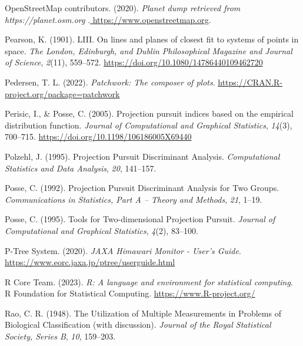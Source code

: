 \documentclass[
  letterpaper,
]{book}
\newlength{\cslhangindent}
\newlength{\cslentryspacingunit} %
\newenvironment{CSLReferences}[2] %
 {%
  \setlength{\parindent}{0pt}
  \ifodd #1
  \let\oldpar\par
  \def\par{\hangindent=\cslhangindent\oldpar}
  \fi
  \setlength{\parskip}{#2\cslentryspacingunit}
 }%
 {}
\begin{document}
\begin{CSLReferences}{1}{0}
\leavevmode{}%
OpenStreetMap contributors. (2020). \emph{{Planet dump retrieved from
https://planet.osm.org
}}.\href{\%20https://www.openstreetmap.org\%20}{ https://www.openstreetmap.org}.

\leavevmode{}%
Pearson, K. (1901). LIII. On lines and planes of closest fit to systems
of points in space. \emph{The London, Edinburgh, and Dublin
Philosophical Magazine and Journal of Science}, \emph{2}(11), 559--572.
\url{https://doi.org/10.1080/14786440109462720}

\leavevmode{}%
Pedersen, T. L. (2022). \emph{Patchwork: The composer of plots}.
\url{https://CRAN.R-project.org/package=patchwork}

\leavevmode{}%
Perisic, I., \& Posse, C. (2005). Projection pursuit indices based on
the empirical distribution function. \emph{Journal of Computational and
Graphical Statistics}, \emph{14}(3), 700--715.
\url{https://doi.org/10.1198/106186005X69440}

\leavevmode{}%
Polzehl, J. (1995). Projection {P}ursuit {D}iscriminant {A}nalysis.
\emph{Computational Statistics and Data Analysis}, \emph{20}, 141--157.

\leavevmode{}%
Posse, C. (1992). Projection {P}ursuit {D}iscriminant {A}nalysis for
{T}wo {G}roups. \emph{Communications in Statistics, Part A -- Theory and
Methods}, \emph{21}, 1--19.

\leavevmode{}%
Posse, C. (1995). Tools for {T}wo-dimensional {P}rojection {P}ursuit.
\emph{Journal of Computational and Graphical Statistics}, \emph{4}(2),
83--100.

\leavevmode{}%
P-Tree System. (2020). \emph{{JAXA Himawari Monitor - User's Guide}}.
\url{https://www.eorc.jaxa.jp/ptree/userguide.html}

\leavevmode{}%
R Core Team. (2023). \emph{R: A language and environment for statistical
computing}. R Foundation for Statistical Computing.
\url{https://www.R-project.org/}

\leavevmode{}%
Rao, C. R. (1948). The {U}tilization of {M}ultiple {M}easurements in
{P}roblems of {B}iological {C}lassification (with discussion).
\emph{Journal of the Royal Statistical Society, Series B}, \emph{10},
159--203.


\end{CSLReferences}
\end{document}
